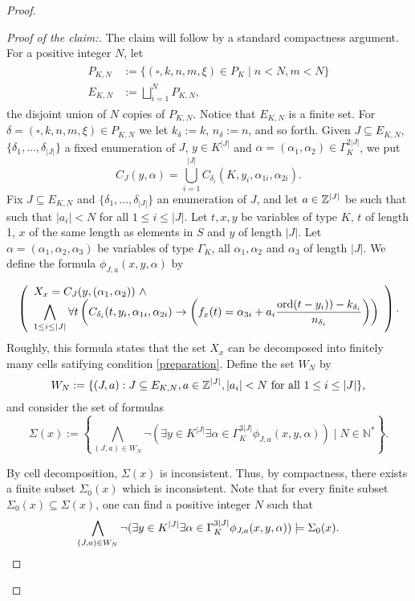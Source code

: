 \begin{proof}
\begin{proof}[Proof of the claim:]
The claim will follow by a standard compactness argument. For a positive integer $N$, let 
\begin{align}\label{defPK}
\begin{split}
P_{K,N}&:= \{(\square, k,n,m,\xi)\in P_K \mid n<N, m<N\}\\
E_{K,N} &:= \bigsqcup_{i=1}^N P_{K,N},
\end{split}
\end{align}
the disjoint union of $N$ copies of $P_{K,N}$. Notice that $E_{K,N}$ is a finite set. For $\delta=(\square, k,n,m,\xi)\in P_{K,N}$ we let $k_{\delta}:=k$, $n_\delta:=n$, and so forth. Given $J\subseteq E_{K,N}$, $\{\delta_1,\ldots,\delta_{|J|}\}$ a fixed enumeration of $J$, $y\in K^{|J|}$ and $\alpha=(\alpha_1,\alpha_2)\in \Gamma_K^{2|J|}$, we put 
\[C_J(y,\alpha)=\bigcup_{i=1}^{|J|} C_{\delta_i}(K,y_i,\alpha_{1i},\alpha_{2i}).
\]
Fix $J\subseteq E_{K,N}$ and $\{\delta_1,\ldots,\delta_{|J|}\}$ an enumeration of $J$, and let $a\in{\mathbb Z}^{|J|}$ be such that such that $|a_i|<N$ for all $1\leq i\leq |J|$. Let $t,x,y$ be variables of type $K$, $t$ of length 1, $x$ of the same length as elements in $S$ and $y$ of length $|J|$. Let $\alpha=(\alpha_1,\alpha_2,\alpha_3)$ be variables of type $\Gamma_K$, all $\alpha_1,\alpha_2$ and $\alpha_3$ of length $|J|$. We define the formula $\phi_{J,a}(x,y,\alpha)$
by

\small
\begin{equation}\label{cellformula}
\left(\begin{array}{l}
X_x=C_J(y,(\alpha_1,\alpha_2))\ \wedge \\
\displaystyle\bigwedge_{1\leq i\leq |J|} \forall t \left( C_{\delta_i}(t,y_i,\alpha_{1i},\alpha_{2i})\to \left(f_x(t)=\alpha_{3i}+a_i\frac{\operatorname{ord}(t-y_i))-k_{\delta_i}}{n_{\delta_i}}\right)\right)\end{array}\right).\\
\end{equation}
Roughly, this formula states that the set $X_x$ can be decomposed into finitely many cells satifying condition \ref{preparation}. Define the set $W_N$ by 
\begin{equation}\label{WN}
W_N:=\{(J,a): J\subseteq E_{K,N}, a\in {\mathbb Z}^{|J|}, |a_i|<N \text{ for all } 1\leq i\leq |J|\},
\end{equation}
and consider the set of formulas 
\[\Sigma(x):=\left\{ \bigwedge_{(J,a)\in W_N} \neg (\exists y\in K^{|J|}\exists \alpha\in \Gamma_{K}^{3|J|}\phi_{J,a}(x,y,\alpha)) \mid N\in\mathbb{N}^*\right\}.
\]

By cell decomposition, $\Sigma(x)$ is inconsistent. Thus, by compactness, there exists a finite subset $\Sigma_0(x)$ which is inconsistent. Note that for every finite subset $\Sigma_0(x)\subseteq\Sigma(x)$, one can find a positive integer $N$ such that 
\[\bigwedge_{(J,a)\in W_N} \neg (\exists y\in K^{|J|}\exists \alpha\in \Gamma_{K}^{3|J|}\phi_{J,a}(x,y,\alpha)) \models \Sigma_0(x).
\end{equation*}

\]
\end{proof}
\end{proof}

